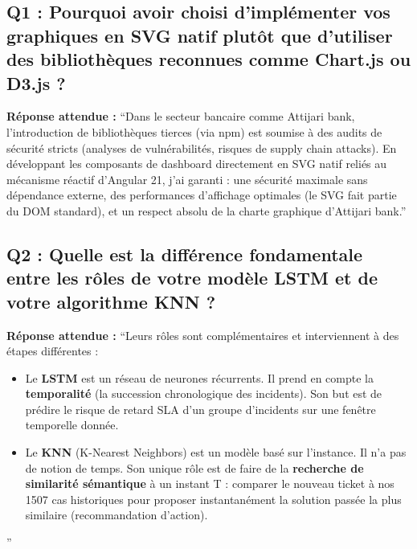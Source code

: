 \documentclass[11pt,a4paper]{article}
\begin{document}
\subsection*{Q1 : Pourquoi avoir choisi d'implémenter vos graphiques en SVG natif plutôt que d'utiliser des bibliothèques reconnues comme Chart.js ou D3.js ?}
\begin{responsebox}
\textbf{Réponse attendue :} ``Dans le secteur bancaire comme Attijari bank, l'introduction de bibliothèques tierces (via npm) est soumise à des audits de sécurité stricts (analyses de vulnérabilités, risques de supply chain attacks). En développant les composants de dashboard directement en SVG natif reliés au mécanisme réactif d'Angular 21, j'ai garanti : une sécurité maximale sans dépendance externe, des performances d'affichage optimales (le SVG fait partie du DOM standard), et un respect absolu de la charte graphique d'Attijari bank.''
\end{responsebox}

\subsection*{Q2 : Quelle est la différence fondamentale entre les rôles de votre modèle LSTM et de votre algorithme KNN ?}
\begin{responsebox}
\textbf{Réponse attendue :} ``Leurs rôles sont complémentaires et interviennent à des étapes différentes :
\begin{itemize}
    \item Le \textbf{LSTM} est un réseau de neurones récurrents. Il prend en compte la \textbf{temporalité} (la succession chronologique des incidents). Son but est de prédire le risque de retard SLA d'un groupe d'incidents sur une fenêtre temporelle donnée.
    \item Le \textbf{KNN} (K-Nearest Neighbors) est un modèle basé sur l'instance. Il n'a pas de notion de temps. Son unique rôle est de faire de la \textbf{recherche de similarité sémantique} à un instant T : comparer le nouveau ticket à nos 1507 cas historiques pour proposer instantanément la solution passée la plus similaire (recommandation d'action).
\end{itemize}''
\end{responsebox}
\end{document}
